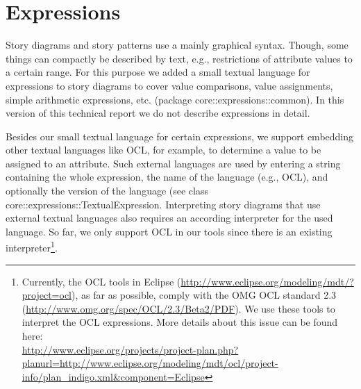\section{Expressions} \label{sec:Expressions}

Story diagrams and story patterns use a mainly graphical syntax.
Though, some things can compactly be described by text, e.g., restrictions of attribute values to a certain range.
For this purpose we added a small textual language for expressions to story diagrams
to cover value comparisons, value assignments, simple arithmetic expressions, etc. (package \textsf{core::expressions::common}).
In this version of this technical report we do not describe expressions in detail.

Besides our small textual language for certain expressions, we support embedding other textual languages like OCL,
for example, to determine a value to be assigned to an attribute.
Such external languages are used by entering a string containing the whole expression,
the name of the language (e.g., OCL),
and optionally the version of the language
(see class \textsf{core::expressions::TextualExpression}.
Interpreting story diagrams that use external textual languages also requires an according interpreter for the used language.
So far, we only support OCL in our tools since there is an existing interpreter\footnote{Currently,
the OCL tools in Eclipse (\href{http://www.eclipse.org/modeling/mdt/?project=ocl}{http://www.eclipse.org/modeling/mdt/?project=ocl}),
as far as possible, comply with the OMG OCL standard 2.3 (\href{http://www.omg.org/spec/OCL/2.3/Beta2/PDF}{http://www.omg.org/spec/OCL/2.3/Beta2/PDF}).
We use these tools to interpret the OCL expressions.
More details about this issue can be found here:\\ \href{http://www.eclipse.org/projects/project-plan.php?planurl=http://www.eclipse.org/modeling/mdt/ocl/project-info/plan_indigo.xml&component=Eclipse}{http://www.eclipse.org/projects/project-plan.php?planurl=http://www.eclipse.org/modeling/mdt/ocl/project-info/plan\_indigo.xml\&component=Eclipse}}.